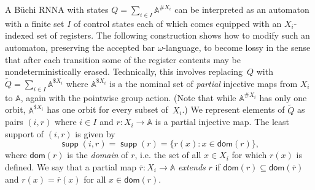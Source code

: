 \documentclass[10pt,a4paper]{amsart}
\newcommand{\compr}{:}
\numberwithin{equation}{section}
\newcommand{\ol}{\overline}
\newcommand{\seq}{\subseteq}
\newcommand{\tl}{\widetilde}
\newcommand{\dom}{\mathsf{dom}}
\newcommand{\+}[1]{\mathcal{#1}\xspace}
\newcommand{\names}{\mathbb{A}}
\DeclareMathOperator{\supp}{\mathsf{supp}} %
\theoremstyle{definition}
\begin{document}
\noindent A Büchi RNNA with states $Q=\sum_{i\in I} \names^{\# X_i}$ can be
interpreted as an automaton with a finite set $I$ of control states
each of which comes equipped with an $X_i$-indexed set of
registers. The following construction shows how to modify such an
automaton, preserving the accepted bar $\omega$-language, to become lossy in the
sense that after each transition some of the register contents may be
nondeterministically erased. Technically, this involves replacing~$Q$
with $\tl{Q}=\sum_{i\in I} \names^{\$ X_i}$ where $\names^{\$ X_i}$ is
a the nominal set of \emph{partial} injective maps from $X_i$ to
$\names$, again with the pointwise group action. (Note that while
$\names^{\# X_i}$ has only one orbit, $\names^{\$ X_i}$ has one orbit
for every subset of~$X_i$.) We represent elements of $\tl{Q}$ as pairs
$(i,r)$ where $i\in I$ and $r\colon X_i\to \names$ is a partial
injective map. The least support of $(i,r)$ is given by
\[
  \supp(i,r) = \supp(r) = \{ r(x) \compr x\in  \dom(r)\},
\]
where $\dom(r)$ is the \emph{domain} of $r$, i.e. the set of all
$x\in X_i$ for which $r(x)$ is defined. We say that a partial map
$\ol{r}\colon X_i\to \names$ \emph{extends} $r$ if
$\dom(r)\seq \dom(\ol{r})$ and $r(x)=\ol{r}(x)$ for all
$x\in \dom(r)$.
\end{document}
